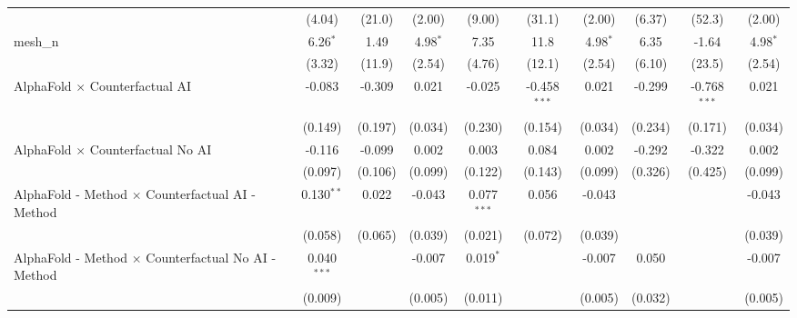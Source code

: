 \begin{tabular}{lccccccccc}
                                                               & (4.04)        & (21.0)        & (2.00)        & (9.00)        & (31.1)         & (2.00)        & (6.37)        & (52.3)         & (2.00)\\   
   mesh\_n                                                     & 6.26$^{*}$    & 1.49          & 4.98$^{*}$    & 7.35          & 11.8           & 4.98$^{*}$    & 6.35          & -1.64          & 4.98$^{*}$\\   
                                                               & (3.32)        & (11.9)        & (2.54)        & (4.76)        & (12.1)         & (2.54)        & (6.10)        & (23.5)         & (2.54)\\   
   AlphaFold $\times$ Counterfactual AI                        & -0.083        & -0.309        & 0.021         & -0.025        & -0.458$^{***}$ & 0.021         & -0.299        & -0.768$^{***}$ & 0.021\\   
                                                               & (0.149)       & (0.197)       & (0.034)       & (0.230)       & (0.154)        & (0.034)       & (0.234)       & (0.171)        & (0.034)\\   
   AlphaFold $\times$ Counterfactual No AI                     & -0.116        & -0.099        & 0.002         & 0.003         & 0.084          & 0.002         & -0.292        & -0.322         & 0.002\\   
                                                               & (0.097)       & (0.106)       & (0.099)       & (0.122)       & (0.143)        & (0.099)       & (0.326)       & (0.425)        & (0.099)\\   
   AlphaFold - Method $\times$ Counterfactual AI - Method      & 0.130$^{**}$  & 0.022         & -0.043        & 0.077$^{***}$ & 0.056          & -0.043        &               &                & -0.043\\   
                                                               & (0.058)       & (0.065)       & (0.039)       & (0.021)       & (0.072)        & (0.039)       &               &                & (0.039)\\   
   AlphaFold - Method $\times$ Counterfactual No AI - Method   & 0.040$^{***}$ &               & -0.007        & 0.019$^{*}$   &                & -0.007        & 0.050         &                & -0.007\\   
                                                               & (0.009)       &               & (0.005)       & (0.011)       &                & (0.005)       & (0.032)       &                & (0.005)\\   

\end{tabular}
